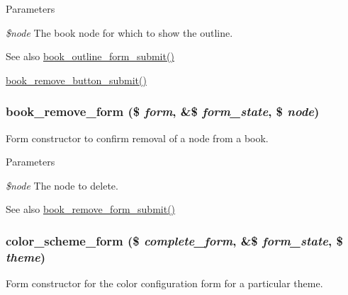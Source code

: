 \begin{DoxyParams}{Parameters}
\item[{\em \$node}]The book node for which to show the outline.\end{DoxyParams}
\begin{DoxySeeAlso}{See also}
\hyperlink{book_8pages_8inc_ad5f27af5889dbe2ad72df81fd4cd2665}{book\_\-outline\_\-form\_\-submit()} 

\hyperlink{book_8pages_8inc_abcf4790efab7bbb44fda88de9ed0847e}{book\_\-remove\_\-button\_\-submit()} 
\end{DoxySeeAlso}
\hypertarget{group__forms_gab7e8aa290196982f23b50a984e215805}{
\subsubsection[{book\_\-remove\_\-form}]{\setlength{\rightskip}{0pt plus 5cm}book\_\-remove\_\-form (\$ {\em form}, \/  \&\$ {\em form\_\-state}, \/  \$ {\em node})}}
\label{group__forms_gab7e8aa290196982f23b50a984e215805}
Form constructor to confirm removal of a node from a book.


\begin{DoxyParams}{Parameters}
\item[{\em \$node}]The node to delete.\end{DoxyParams}
\begin{DoxySeeAlso}{See also}
\hyperlink{book_8pages_8inc_aca2b07a50dae6ef3a271b984dae19c7e}{book\_\-remove\_\-form\_\-submit()} 
\end{DoxySeeAlso}
\hypertarget{group__forms_ga96d9b56f10f5a4d4178d43444732fb09}{
\subsubsection[{color\_\-scheme\_\-form}]{\setlength{\rightskip}{0pt plus 5cm}color\_\-scheme\_\-form (\$ {\em complete\_\-form}, \/  \&\$ {\em form\_\-state}, \/  \$ {\em theme})}}
\label{group__forms_ga96d9b56f10f5a4d4178d43444732fb09}
Form constructor for the color configuration form for a particular theme.



